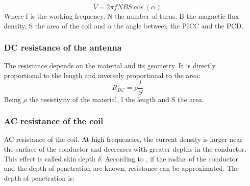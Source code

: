 \documentclass{article} %
\begin{document}
\begin{multicols}{2}
\begin{equation}
{V = 2 \pi fNBS\cos(\alpha)}
\end{equation}
Where f is the working frequency, N the number of turns, B the magnetic flux density, S the area of the coil and $\alpha$ the angle between the PICC and the PCD.


\subsubsection{DC resistance of the antenna}
The resistance depends on the material and its geometry. It is directly proportional to the length and inversely proportional to the area:
\begin{equation}
{R_{DC} = \rho \frac{l}{S}}
\end{equation}
\newline
Being $\rho$  the resistivity of the material, l the length and S the area.




\subsubsection{AC resistance of the coil}
AC resistance of the coil. At high frequencies, the current density is larger near the surface of the conductor and decreases with greater depths in the conductor. This effect is called skin depth $\delta$.
According to  \cite{c9}, if the radius of the conductor and the depth of penetration are known, resistance can be approximated. The depth of penetration is:


\end{multicols}
\end{document}
